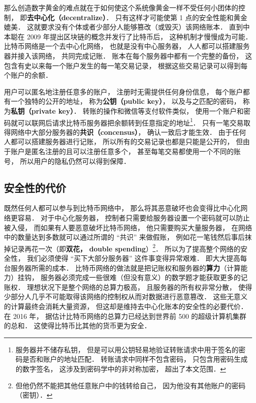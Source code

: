 那么创造数字黄金的难点就在于如何使这个系统像黄金一样不受任何小团体的控制， 即\textbf{去中心化（decentralize）}． 只有这样才可能使第 1 点的安全性能和黄金媲美． 这就要求没有个体或者少部分人能够篡改（或毁灭）该网络账本． 直到中本聪在 2009 年提出区块链的概念并发行了比特币后， 这种机制才慢慢成为可能． 比特币网络是一个去中心化网络， 也就是没有中心服务器， 人人都可以搭建服务器并接入该网络， 共同完成记账． 账本在每个服务器中都有一个完整的备份， 这包含有史以来每一个账户发生的每一笔交易记录， 根据这些交易记录可以得到每个账户的余额．

用户可以匿名地注册任意多的账户， 注册时无需提供任何身份信息， 每个账户都有一个独特的公开的地址， 称为\textbf{公钥（public key）}， 以及与之匹配的密码， 称为\textbf{私钥（private key）}． 转账的操作和微信等支付软件类似， 使用一个账户和密码就可以联网后请求比特币服务器把余额转到任意指定的地址\footnote{服务器并不储存私钥， 但是可以用公钥轻易地验证转账请求中用于签名的密码是否和账户的地址匹配． 转账请求中同样不包含密码， 只包含用密码生成的数字签名， 这涉及到密码学中的非对称加密， 超出了本文范围．}． 只有一笔交易取得网络中大部分服务器的\textbf{共识（concensus）}， 确认一致后才能生效． 由于任何人都可以搭建服务器进行记账， 所以所有的交易记录也都是只能是公开的， 但由于账户是匿名注册的且可以注册任意多个， 甚至每笔交易都使用一个不同的账号， 所以用户的隐私仍然可以得到保障．

\subsection{安全性的代价}
既然任何人都可以参与到比特币网络中， 那么将其恶意破坏也会变得比中心化网络更容易． 对于中心化服务器， 控制者只需要给服务器设置一个密码就可以防止被入侵， 而如果有人要恶意破坏比特币网络， 他只需要购买大量服务器， 在网络中的数量达到多数就可以通过所谓的 “共识” 来做假账， 例如花一笔钱然后事后抹掉记录再花一次（即\textbf{双花， double spending}）\footnote{但他仍然不能把其他任意账户中的钱转给自己， 因为他没有其他账户的密码（密钥）．}． 所以为了提高整个网络的安全性， 我们必须使得 “买下大部分服务器” 这件事变得异常艰难． 即大大提高每台服务器所需的成本． 比特币网络的做法就是把记账权和服务器的\textbf{算力}（计算能力）挂钩， 服务器必须完成一些很难（但没有意义）的数学题才能获取更多的记账权． 理想状况下是整个网络的总算力极高， 且服务器的所有权非常分散， 使得少部分人几乎不可能取得该网络的控制权从而对数据进行恶意篡改． 这些无意义的计算最终会消耗大量资源， 但这却是维持去中心化账本的安全性的必要代价． 在 2016 年， 据估计比特币网络的总算力已经达到世界前 500 的超级计算机集群的总和． 这使得比特币比其他的货币更为安全．


